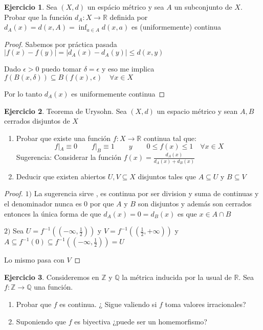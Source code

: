 \documentclass[12pt]{article}
\newcommand{\Q}{\mathbb{Q}}
\newcommand{\R}{\mathbb{R}}
\newcommand{\Z}{\mathbb{Z}}
\newcommand{\ra}{\rightarrow}
\theoremstyle{definition}
\newtheorem{ej}{Ejercicio}
\begin{document}
 \begin{ej}
   Sea $(X,d)$ un espácio métrico y sea $A$ un subconjunto de $X$. Probar que la función $d_A: X \ra \R$ definida por $d_A(x) = d(x,A) = \inf_{a \in A} d(x,a)$ es (uniformemente) continua
   \begin{proof}

     Sabemos por práctica pasada $|f(x) - f(y)| = |d_A(x) - d_A(y)| \leq d(x,y)$

    Dado $\epsilon > 0 $ puedo tomar $\delta = \epsilon $ y eso me implica $f(B(x,\delta)) \subseteq B(f(x),\epsilon) \quad \forall x \in X$

    Por lo tanto $d_A(x)$ es uniformemente continua
   \end{proof}
 \end{ej}
 \begin{ej}
   Teorema de Urysohn. Sea $(X,d)$ un espacio métrico y sean $A,B$ cerrados disjuntos de $X$
   \begin{enumerate}
     \item Probar que existe una función $f: X \ra \R$ continua tal que: 
       $$ f|_A \equiv 0  \quad \quad f|_{B} \equiv 1 \quad \quad y \quad \quad 0 \leq f(x) \leq 1 \quad \forall x \in X$$
       Sugerencia: Considerar la función $f(x) = \frac{d_A(x)}{d_A(x) + d_B(x)}$
     \item Deducir que existen abiertos $U,V \subseteq X$ disjuntos tales que $A \subseteq U$ y $B \subseteq V$
   \end{enumerate}
   \begin{proof}
   $1)$    La sugerencia sirve , es continua por ser division y suma de continuas y el denominador nunca es $0$ por que $A$ y $B$ son disjuntos y además son cerrados entonces la única forma de que $d_A(x) = 0 = d_B(x)$ es que $x \in A \cap B $ 

 $2)$ Sea $U = f^{-1}((-\infty,\frac{1}{2}))$ y $V=f^{-1}((\frac{1}{2},+\infty))$ y $A \subseteq f^{-1}(0) \subseteq f^{-1}( (-\infty,\frac{1}{2})) = U$

 Lo mismo pasa con $V$
   \end{proof}
 \end{ej}
 \begin{ej}
   Consideremos en $\Z$ y $\Q$ la métrica inducida por la usual de $\R$. Sea $f: \Z \ra \Q$ una función.
   \begin{enumerate}
     \item Probar que $f$ es continua. ¿ Sigue valiendo si $f$ toma valores irracionales?
     \item Suponiendo que $f$ es biyectiva ¿puede ser un homemorfismo?
   \end{enumerate}
 \end{ej}
\end{document}
